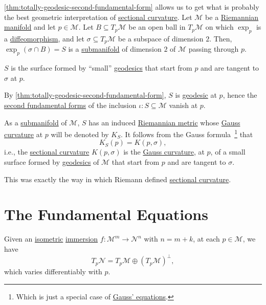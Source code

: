 \autoref{thm:totally-geodesic-second-fundamental-form} allows us to get what is probably the best geometric interpretation of \hyperref[def:sectional-curvature]{sectional curvature}. Let \(\mathcal{M} \) be a \hyperref[def:Riemannian-manifold]{Riemannian manifold} and let \(p\in \mathcal{M} \). Let \(B \subseteq T_p \mathcal{M} \) be an open ball in \(T_p \mathcal{M} \) on which \(\exp_p\) is a \hyperref[def:diffeomorphism]{diffeomorphism}, and let \(\sigma \subseteq T_p \mathcal{M} \) be a subspace of dimension \(2\). Then, \(\exp_p(\sigma \cap B) = S\) is a \hyperref[def:submanifold]{submanifold} of dimension \(2\) of \(\mathcal{M} \) passing through \(p\).

\begin{intuition}
	\(S\) is the surface formed by ``small'' \hyperref[def:geodesic]{geodesics} that start from \(p\) and are tangent to \(\sigma \) at \(p\).
\end{intuition}

\begin{note}
	By \autoref{thm:totally-geodesic-second-fundamental-form}, \(S\) is \hyperref[def:geodesic]{geodesic} at \(p\), hence the \hyperref[def:2nd-fundamental-form]{second fundamental forms} of the inclusion \(\iota \colon S \subseteq \mathcal{M} \) vanish at \(p\).
\end{note}

As a \hyperref[def:submanifold]{submanifold} of \(\mathcal{M} \), \(S\) has an induced \hyperref[def:Riemannian-metric]{Riemannian metric} whose \hyperref[rmk:Gauss-curvature]{Gauss curvature} at \(p\) will be denoted by \(K_S\). It follows from the Gauss formula~\cite[ Theorem 2.5]{flaherty2013riemannian}\footnote{Which is just a special case of \hyperref[thm:Gauss-equations]{Gauss' equations}.} that
\[
	K_S(p) = K(p, \sigma ),
\]
i.e., the \hyperref[def:sectional-curvature]{sectional curvature} \(K(p, \sigma )\) is the \hyperref[rmk:Gauss-curvature]{Gauss curvature}, at \(p\), of a small surface formed by \hyperref[def:geodesic]{geodesics} of \(\mathcal{M} \) that start from \(p\) and are tangent to \(\sigma \).

\begin{remark}
	This was exactly the way in which Riemann defined \hyperref[def:sectional-curvature]{sectional curvature}.
\end{remark}

\section{The Fundamental Equations}
Given an \hyperref[def:isometry]{isometric} \hyperref[def:immersion]{immersion} \(f\colon \mathcal{M} ^m \to \mathcal{N} ^n\) with \(n = m + k\), at each \(p\in \mathcal{M} \), we have
\[
	T_p \mathcal{N} = T_p \mathcal{M} \oplus (T_p \mathcal{M} ) ^{\perp},
\]
which varies differentiably with \(p\).

